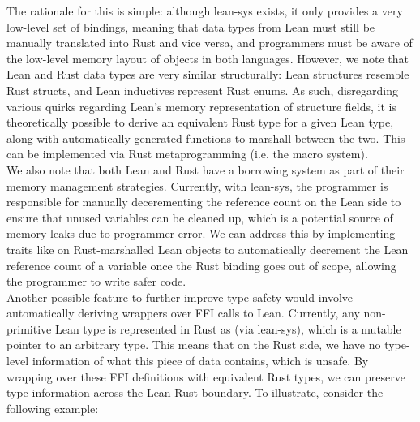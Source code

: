 The rationale for this is simple: although lean-sys exists, it only provides a very low-level set of bindings, meaning that data types from Lean must still be manually translated into Rust and vice versa, and programmers must be aware of the low-level memory layout of objects in both languages. However, we note that Lean and Rust data types are very similar structurally: Lean structures resemble Rust structs, and Lean inductives represent Rust enums. As such, disregarding various quirks regarding Lean's memory representation of structure fields, it is theoretically possible to derive an equivalent Rust type for a given Lean type, along with automatically-generated functions to marshall between the two. This can be implemented via Rust metaprogramming (i.e. the macro system).
\\

We also note that both Lean and Rust have a borrowing system as part of their memory management strategies. Currently, with lean-sys, the programmer is responsible for manually decerementing the reference count on the Lean side to ensure that unused variables can be cleaned up, which is a potential source of memory leaks due to programmer error. We can address this by implementing traits like  on Rust-marshalled Lean objects to automatically decrement the Lean reference count of a variable once the Rust binding goes out of scope, allowing the programmer to write safer code.
\\

Another possible feature to further improve type safety would involve automatically deriving wrappers over FFI calls to Lean. Currently, any non-primitive Lean type is represented in Rust as  (via lean-sys), which is a mutable pointer to an arbitrary  type. This means that on the Rust side, we have no type-level information of what this piece of data contains, which is unsafe. By wrapping over these FFI definitions with equivalent Rust types, we can preserve type information across the Lean-Rust boundary. To illustrate, consider the following example:

